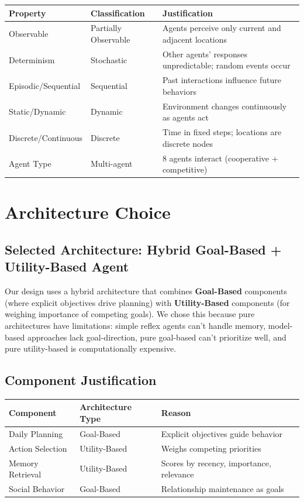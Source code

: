 \documentclass[12pt,a4paper]{article}
\begin{document}
\begin{table}[H]
\centering
\small
\begin{tabular}{|l|l|p{7cm}|}
\hline
\textbf{Property} & \textbf{Classification} & \textbf{Justification} \\
\hline
Observable & Partially Observable & Agents perceive only current and adjacent locations \\
Determinism & Stochastic & Other agents' responses unpredictable; random events occur \\
Episodic/Sequential & Sequential & Past interactions influence future behaviors \\
Static/Dynamic & Dynamic & Environment changes continuously as agents act \\
Discrete/Continuous & Discrete & Time in fixed steps; locations are discrete nodes \\
Agent Type & Multi-agent & 8 agents interact (cooperative + competitive) \\
\hline
\end{tabular}
\end{table}

\section{Architecture Choice}

\subsection{Selected Architecture: Hybrid Goal-Based + Utility-Based Agent}

Our design uses a hybrid architecture that combines \textbf{Goal-Based} components (where explicit objectives drive planning) with \textbf{Utility-Based} components (for weighing importance of competing goals). We chose this because pure architectures have limitations: simple reflex agents can't handle memory, model-based approaches lack goal-direction, pure goal-based can't prioritize well, and pure utility-based is computationally expensive.

\subsection{Component Justification}

\begin{table}[H]
\centering
\small
\begin{tabular}{|l|l|p{6cm}|}
\hline
\textbf{Component} & \textbf{Architecture Type} & \textbf{Reason} \\
\hline
Daily Planning & Goal-Based & Explicit objectives guide behavior \\
Action Selection & Utility-Based & Weighs competing priorities \\
Memory Retrieval & Utility-Based & Scores by recency, importance, relevance \\
Social Behavior & Goal-Based & Relationship maintenance as goals \\
\hline
\end{tabular}
\end{table}
\end{document}
